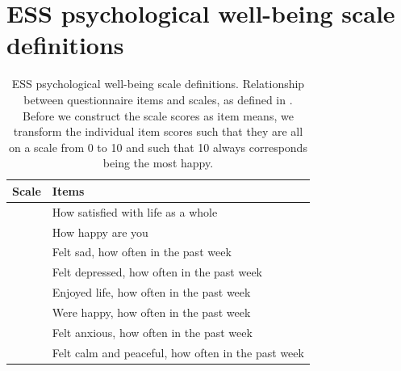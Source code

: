 \documentclass[]{interact}
\theoremstyle{plain}%
\theoremstyle{definition}
\theoremstyle{remark}
\begin{document}
\section{ESS psychological well-being scale definitions}
\label{appendix.essscales}
\begin{table}[H]
\renewcommand\thetable{C1}
\centering
\caption{ESS psychological well-being scale definitions. Relationship between questionnaire items and scales, as defined in \cite{ESStopline5}. Before we construct the scale scores as item means, we transform the individual item scores such that they are all on a scale from 0 to 10 and such that 10 always corresponds being the most happy.}
\label{table:items}
\scriptsize
{}
\bgroup
\def\arraystretch{1.5}
\begin{tabular}{ll}
\hline
Scale & Items \\
\hline
\rowcolor{lightgray} & How satisfied with life as a whole \\
\rowcolor{lightgray}\multirow{-2}{*}{Evaluative well-being }& How happy are you\\

\rowcolor{white} & Felt sad, how often in the past week\\
\rowcolor{white} & Felt depressed, how often in the past week\\
\rowcolor{white} & Enjoyed life, how often in the past week\\
\rowcolor{white} & Were happy, how often in the past week\\
\rowcolor{white} & Felt anxious, how often in the past week\\
\rowcolor{white}\multirow{-6}{*}{Emotional well-being} & Felt calm and peaceful, how often in the past week\\


\end{tabular}
\end{table}
\end{document}
